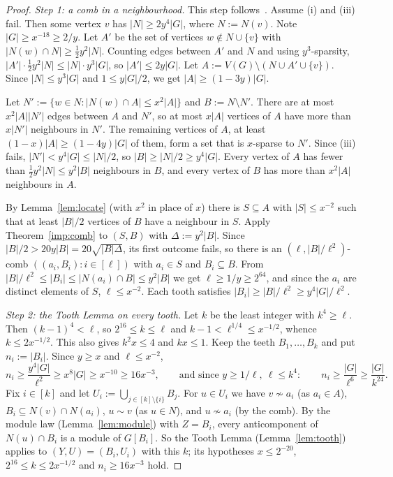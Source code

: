 \begin{proof}
\emph{Step 1: a comb in a neighbourhood.} This step follows~\cite[Claim 5.2.1]{NSS7}. Assume (i) and
(iii) fail. Then some vertex $v$ has $|N|\ge2y^4|G|$, where $N:=N(v)$. Note $|G|\ge x^{-18}\ge2/y$. Let
$A'$ be the set of vertices $w\notin N\cup\{v\}$ with $|N(w)\cap N|\ge\frac12y^2|N|$. Counting edges between
$A'$ and $N$ and using $y^3$-sparsity, $|A'|\cdot\frac12y^2|N|\le|N|\cdot y^3|G|$, so $|A'|\le2y|G|$. Let
$A:=V(G)\setminus(N\cup A'\cup\{v\})$. Since $|N|\le y^3|G|$ and $1\le y|G|/2$, we get $|A|\ge(1-3y)|G|$.

Let $N':=\{w\in N:|N(w)\cap A|\le x^2|A|\}$ and $B:=N\setminus N'$. There are at most $x^2|A||N'|$ edges between
$A$ and $N'$, so at most $x|A|$ vertices of $A$ have more than $x|N'|$ neighbours in $N'$. The remaining
vertices of $A$, at least $(1-x)|A|\ge(1-4y)|G|$ of them, form a set that is $x$-sparse to $N'$. Since (iii)
fails, $|N'|<y^4|G|\le|N|/2$, so $|B|\ge|N|/2\ge y^4|G|$. Every vertex of $A$ has fewer than
$\frac12y^2|N|\le y^2|B|$ neighbours in $B$, and every vertex of $B$ has more than $x^2|A|$ neighbours in $A$.

By Lemma~\ref{lem:locate} (with $x^2$ in place of $x$) there is $S\subseteq A$ with $|S|\le x^{-2}$ such that at
least $|B|/2$ vertices of $B$ have a neighbour in $S$. Apply Theorem~\ref{imp:comb} to $(S,B)$ with
$\Delta:=y^2|B|$. Since $|B|/2>20y|B|=20\sqrt{|B|\Delta}$, its first outcome fails, so there is an
$(\ell,|B|/\ell^2)$-comb $((a_i,B_i):i\in[\ell])$ with $a_i\in S$ and $B_i\subseteq B$. From $|B|/\ell^2\le
|B_i|\le|N(a_i)\cap B|\le y^2|B|$ we get $\ell\ge1/y\ge2^{64}$, and since the $a_i$ are distinct elements of
$S$, $\ell\le x^{-2}$. Each tooth satisfies $|B_i|\ge|B|/\ell^2\ge y^4|G|/\ell^2$.

\emph{Step 2: the Tooth Lemma on every tooth.} Let $k$ be the least integer with $k^4\ge\ell$. Then
$(k-1)^4<\ell$, so $2^{16}\le k\le\ell$ and $k-1<\ell^{1/4}\le x^{-1/2}$, whence $k\le2x^{-1/2}$. This also
gives $k^2x\le4$ and $kx\le1$. Keep the teeth $B_1,\dots,B_k$ and put $n_i:=|B_i|$. Since $y\ge x$ and
$\ell\le x^{-2}$,
\[
n_i\ge\frac{y^4|G|}{\ell^2}\ge x^8|G|\ge x^{-10}\ge16x^{-3},
\qquad\text{and since }y\ge1/\ell,\ \ell\le k^4:\qquad n_i\ge\frac{|G|}{\ell^6}\ge\frac{|G|}{k^{24}}.
\]
Fix $i\in[k]$ and let $U_i:=\bigcup_{j\in[k]\setminus\{i\}}B_j$. For $u\in U_i$ we have $v\not\sim a_i$ (as
$a_i\in A$), $B_i\subseteq N(v)\cap N(a_i)$, $u\sim v$ (as $u\in N$), and $u\not\sim a_i$ (by the comb). By the
module law (Lemma~\ref{lem:module}) with $Z=B_i$, every anticomponent of $N(u)\cap B_i$ is a module of
$G[B_i]$. So the Tooth Lemma (Lemma~\ref{lem:tooth}) applies to $(Y,U)=(B_i,U_i)$ with this $k$; its
hypotheses $x\le2^{-20}$, $2^{16}\le k\le2x^{-1/2}$ and $n_i\ge16x^{-3}$ hold.


\end{proof}
